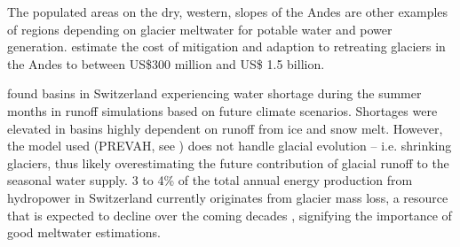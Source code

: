 \documentclass[12pt, a4paper]{article}
\begin{document}
The populated areas on the dry, western, slopes of the Andes are other examples
of regions depending on glacier meltwater for potable water and power
generation. \textcite{vergaraEconomicImpactsRapid2007} estimate the cost of
mitigation and adaption to retreating glaciers in the Andes to between US\$300
million and US\$ 1.5 billion.

\textcite{brunnerPresentFutureWater2019} found basins in Switzerland
experiencing water shortage during the summer months in runoff simulations based
on future climate scenarios. Shortages were elevated in basins highly dependent
on runoff from ice and snow melt. However, the model used (PREVAH, see
\cite{viviroliIntroductionHydrologicalModelling2009}) does not handle glacial
evolution -- i.e. shrinking glaciers, thus likely overestimating the future
contribution of glacial runoff to the seasonal water supply. 3 to 4\% of the
total annual energy production from hydropower in Switzerland currently
originates from glacier mass loss, a resource that is expected to decline over
the coming decades \parencite{schaefliRoleGlacierRetreat2019}, signifying the
importance of good meltwater estimations.




\end{document}
